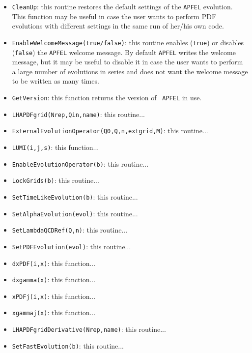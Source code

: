 \documentclass[11pt,a4paper]{article}
\begin{document}
\begin{itemize}
\item{\tt CleanUp}: this routine restores the default settings of the
  {\tt APFEL} evolution. This function may be useful in case the user
  wants to perform PDF evolutions with different settings in the same run
  of her/his own code.

\item{\tt EnableWelcomeMessage(true/false)}: this routine enables
  ({\tt true}) or disables ({\tt false}) the {\tt APFEL} welcome
  message. By default {\tt APFEL} writes the welcome message, but it
  may be useful to disable it in case the user wants to perform a
  large number of evolutions in series and does not want the welcome
  message to be written as many times.

\item{\tt GetVersion}: this function returns the version of {\tt
    APFEL} in use.

\item{\tt LHAPDFgrid(Nrep,Qin,name)}: this routine...

\item{\tt ExternalEvolutionOperator(Q0,Q,n,extgrid,M)}: this routine...

\item{\tt LUMI(i,j,s)}: this function...

\item{\tt EnableEvolutionOperator(b)}: this routine...

\item{\tt LockGrids(b)}: this routine...

\item{\tt SetTimeLikeEvolution(b)}: this routine...

\item{\tt SetAlphaEvolution(evol)}: this routine...

\item{\tt SetLambdaQCDRef(Q,n)}: this routine...

\item{\tt SetPDFEvolution(evol)}: this routine...

\item{\tt dxPDF(i,x)}: this function...

\item{\tt dxgamma(x)}: this function...

\item{\tt xPDFj(i,x)}: this function...

\item{\tt xgammaj(x)}: this function...

\item{\tt LHAPDFgridDerivative(Nrep,name)}: this routine...

\item{\tt SetFastEvolution(b)}: this routine...

\end{itemize}
\end{document}
